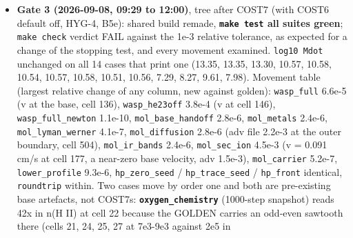 \documentclass[english,a4paper]{my_memo}
\begin{document}
\begin{itemize}
  tolerances, the decision\textquotesingle s own first reason, not passes. The COST6
  extrapolation under the new test is worth nothing (6.79 against 6.82
  passes) and stays default off. Tests: \texttt{coupled\_source\_step} RED 41/3
  against the control, GREEN 44/0; \texttt{mean\_passes\_within\_bound} re-measured
  6.23 (was 6.80), both at the site; \texttt{extrapolation\_lowers\_the\_pass\_count}
  rewritten as \texttt{extrapolation\_does\_not\_cost\_passes}; the fallback-is-one-path
  row replaces the brief\textquotesingle s byte-identity row (a suite cannot hold a golden
  of the previous binary; the identity is measured in the report).
  \texttt{physics\_probe} 1491/0. Recorded, not fixed: the composition increment of
  \texttt{mol\_base\_handoff} has a floor near 5e-9 (127 of 1500 probes cannot reach
  1e-12 in 59 passes), so \texttt{csm\_comp\_tol\ =\ 1e-8} is within a factor of two
  of what that case can reach at all; COST6\textquotesingle s \texttt{n\_csm\_x\_kept} still reads 0.
  \textbf{Every golden of the matrix moves at the 1e-8 level}: gate 3 below.
\item
  \textbf{Gate 3 (2026-09-08, 09:29 to 12:00)}, tree after COST7 (with COST6
  default off, HYG-4, B5e): shared build remade, \textbf{\texttt{make\ test} all suites
  green}; \texttt{make\ check} verdict FAIL against the 1e-3 relative tolerance,
  as expected for a change of the stopping test, and every movement
  examined. \texttt{log10\ Mdot} unchanged on all 14 cases that print one (13.35,
  13.35, 13.30, 10.57, 10.58, 10.54, 10.57, 10.58, 10.51, 10.56, 7.29, 8.27,
  9.61, 7.98). Movement table (largest relative change of any column, new
  against golden): \texttt{wasp\_full} 6.6e-5 (v at the base, cell 136),
  \texttt{wasp\_he23off} 3.8e-4 (v at cell 146), \texttt{wasp\_full\_newton} 1.1e-10,
  \texttt{mol\_base\_handoff} 2.8e-6, \texttt{mol\_metals} 2.4e-6, \texttt{mol\_lyman\_werner}
  4.1e-7, \texttt{mol\_diffusion} 2.8e-6 (adv file 2.2e-3 at the outer boundary,
  cell 504), \texttt{mol\_ir\_bands} 2.4e-6, \texttt{mol\_sec\_ion} 4.5e-3 (v = 0.091 cm/s at
  cell 177, a near-zero base velocity, adv 1.5e-3), \texttt{mol\_carrier} 5.2e-7,
  \texttt{lower\_profile} 9.3e-6, \texttt{hp\_zero\_seed} / \texttt{hp\_trace\_seed} / \texttt{hp\_front}
  identical, \texttt{roundtrip} within. Two cases move by order one and both are
  pre-existing base artefacts, not COST7\textquotesingle s: \textbf{\texttt{oxygen\_chemistry}} (1000-step
  snapshot) reads 42x in n(H II) at cell 22 because the GOLDEN carries an
  odd-even sawtooth there (cells 21, 24, 25, 27 at 7e3-9e3 against 2e5 in

\end{itemize}
\end{document}
